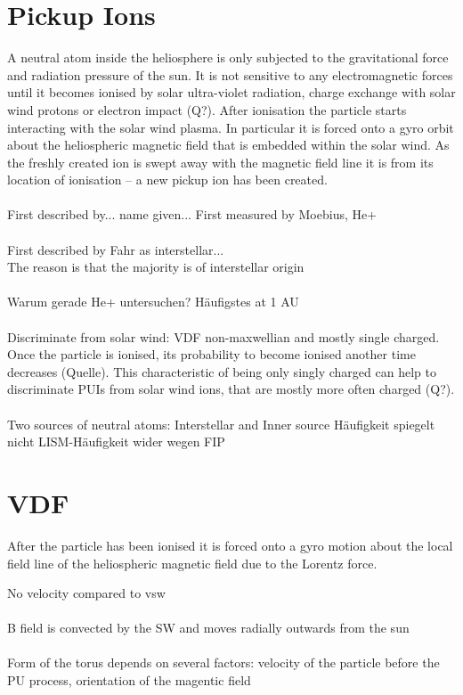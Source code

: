 \section{Pickup Ions}
A neutral atom inside the heliosphere is only subjected to the gravitational force and radiation pressure of the sun. It is not sensitive to any electromagnetic forces until it becomes ionised by solar ultra-violet radiation, charge exchange with solar wind protons or electron impact (Q?). After ionisation the particle starts interacting with the solar wind plasma. In particular it is forced onto a gyro orbit about the heliospheric magnetic field
that is embedded within the solar wind. As the freshly created ion is swept away with the magnetic field line it is  from its location of ionisation -- a new pickup ion has been created.
\\ \\
First described by... name given...
First measured by Moebius, He+
\\ \\
First described by Fahr as interstellar...\\
The reason is that the majority is of interstellar origin
\\ \\
Warum gerade He+ untersuchen? Häufigstes at 1 AU
\\ \\
Discriminate from solar wind: VDF non-maxwellian and mostly single charged.
Once the particle is ionised, its probability to become ionised another time decreases (Quelle). This characteristic of being only singly charged can help to discriminate PUIs from solar wind ions, that are mostly more often charged (Q?).
\\ \\
Two sources of neutral atoms: Interstellar and Inner source
 Häufigkeit spiegelt nicht LISM-Häufigkeit wider wegen FIP
\section{VDF}
After the particle has been ionised it is forced onto a gyro motion about the local field line of the heliospheric magnetic field due to the Lorentz force. 


No velocity compared to vsw
\\ \\
B field is convected by the SW and moves radially outwards from the sun
\\ \\
Form of the torus depends on several factors: velocity of the particle before the PU process, orientation of the magentic field